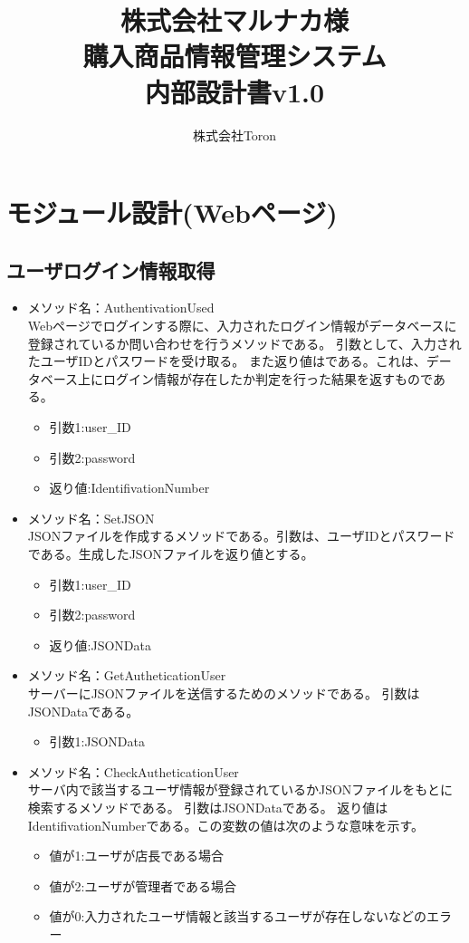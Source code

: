 \documentclass[a4j]{jarticle}
\title{
\vspace{30mm}
株式会社マルナカ様\\
購入商品情報管理システム\\
内部設計書v1.0
\vspace{90mm}
}
\author{
株式会社Toron
}
\begin{document}
\maketitle
\newpage
\tableofcontents
\newpage
\section{モジュール設計(Webページ)}
\subsection{ユーザログイン情報取得}
\begin{itemize}
\item メソッド名：AuthentivationUsed\\
Webページでログインする際に、入力されたログイン情報がデータベースに登録されているか問い合わせを行うメソッドである。
引数として、入力されたユーザIDとパスワードを受け取る。
また返り値はである。これは、データベース上にログイン情報が存在したか判定を行った結果を返すものである。

	\begin{itemize}
		\item 引数1:user\_ID
		\item 引数2:password
		\item 返り値:IdentifivationNumber
	\end{itemize}
\item メソッド名：SetJSON\\

JSONファイルを作成するメソッドである。引数は、ユーザIDとパスワードである。生成したJSONファイルを返り値とする。
	\begin{itemize}
		\item 引数1:user\_ID
		\item 引数2:password
		\item 返り値:JSONData
	\end{itemize}
\item メソッド名：GetAutheticationUser\\

サーバーにJSONファイルを送信するためのメソッドである。
引数はJSONDataである。
	\begin{itemize}
		\item 引数1:JSONData
	\end{itemize}
	
\item メソッド名：CheckAutheticationUser\\

サーバ内で該当するユーザ情報が登録されているかJSONファイルをもとに検索するメソッドである。
引数はJSONDataである。
返り値はIdentifivationNumberである。この変数の値は次のような意味を示す。
	\begin{itemize}
		\item 値が1:ユーザが店長である場合
		\item 値が2:ユーザが管理者である場合
		\item 値が0:入力されたユーザ情報と該当するユーザが存在しないなどのエラー
	\end{itemize}



\end{itemize}
\end{document}
